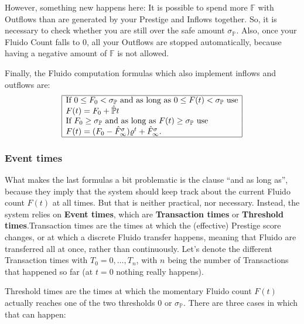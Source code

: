\documentclass[a4paper,12pt]{scrartcl}
\newcounter{formula}
\begin{document}
However, something new happens here: It is possible to spend more $\mathbb{F}$ with Outflows than are generated by your Prestige and Inflows together. So, it is necessary to check whether you are still over the safe amount $\sigma_{\mathbb{P}}$. Also, once your Fluido Count falls to $0$, all your Outflows are stopped automatically, because having a negative amount of $\mathbb{F}$ is not allowed.

Finally, the Fluido computation formulas which also implement inflows and outflows are:
$$
\begin{array}{|l|}
\hline
\mbox{If } 0 \leq F_0 < \sigma_{\mathbb{P}} \mbox{ and as long as } 0 \leq F(t) < \sigma_{\mathbb{P}} \mbox{ use}\\
F(t)=F_0 + \hat{\mathbb{P}}t\\
\mbox{If } F_0 \geq \sigma_{\mathbb{P}} \mbox{ and as long as } F(t) \geq \sigma_{\mathbb{P}} \mbox{ use}\\
F(t)=(F_0-\hat{F}^{\sigma}_{\infty}) \varrho^t + \hat{F}^{\sigma}_{\infty}.\\
\hline
\end{array}$$

\subsubsection{Event times}

What makes the last formulas a bit problematic is the clause ``and as long as'', because they imply that the system should keep track about the current Fluido count $F(t)$ at all times. But that is neither practical, nor necessary. Instead, the system relies on \textbf{Event times}, which are \textbf{Transaction times} or \textbf{Threshold times}.Transaction times are the times at which the (effective) Prestige score changes, or at which a discrete Fluido transfer happens, meaning that Fluido are transferred all at once, rather than continuously. Let's denote the different Transaction times with $T_0 = 0, \ldots, T_n$, with $n$ being the number of Transactions that happened so far (at $t=0$ nothing really happens).

Threshold times are the times at which the momentary Fluido count $F(t)$ actually reaches one of the two thresholds $0$ or $\sigma_{\mathbb{P}}$. There are three cases in which that can happen:
\end{document}

